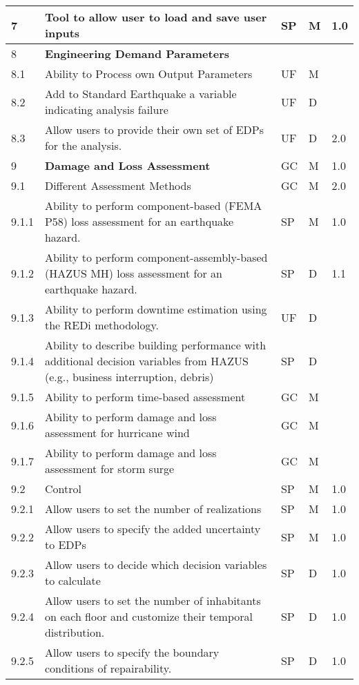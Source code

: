 \begin{longtable}{| p{} | p{} | p{} | p{} |  p{} |}
     7 & Tool to allow user to load and save user inputs & SP & M & 1.0 \\ \hline
    8 & \textbf{Engineering Demand Parameters} &  &  \\ \hline
    8.1 & Ability to Process own Output Parameters & UF & M &   \\ \hline
    8.2 & Add to Standard Earthquake a variable indicating analysis failure & UF & D &   \\ \hline
    8.3 & Allow users to provide their own set of EDPs for the analysis. & UF & D & 2.0\\ \hline

9 & \textbf{Damage and Loss Assessment} & GC & M & 1.0\\ \hline
9.1 & Different Assessment Methods & GC & M & 2.0 \\ \hline
9.1.1 & Ability to perform component-based (FEMA P58) loss assessment for an earthquake hazard. & SP & M & 1.0 \\ \hline
9.1.2 & Ability to perform component-assembly-based (HAZUS MH) loss assessment for an earthquake hazard. & SP & D & 1.1 \\ \hline
9.1.3 & Ability to perform downtime estimation using the REDi methodology. & UF & D & \\ \hline
9.1.4 & Ability to describe building performance with additional decision variables from HAZUS (e.g., business interruption, debris) & SP & D &  \\ \hline
9.1.5 &  Ability to perform time-based assessment & GC & M &  \\ \hline
9.1.6 & Ability to perform damage and loss assessment for hurricane wind & GC & M &  \\ \hline
9.1.7 & Ability to perform damage and loss assessment for storm surge & GC & M &  \\ \hline
9.2 & Control & SP & M & 1.0 \\ \hline
9.2.1 & Allow users to set the number of realizations & SP & M & 1.0\\ \hline
9.2.2 &  Allow users to specify the added uncertainty to EDPs & SP & M & 1.0 \\ \hline
9.2.3 &  Allow users to decide which decision variables to calculate & SP & D & 1.0 \\ \hline
9.2.4 &  Allow users to set the number of inhabitants on each floor and customize their temporal distribution. & SP & D & 1.0 \\ \hline
9.2.5 &  Allow users to specify the boundary conditions of repairability. & SP & D & 1.0 \\ \hline

\end{longtable}
